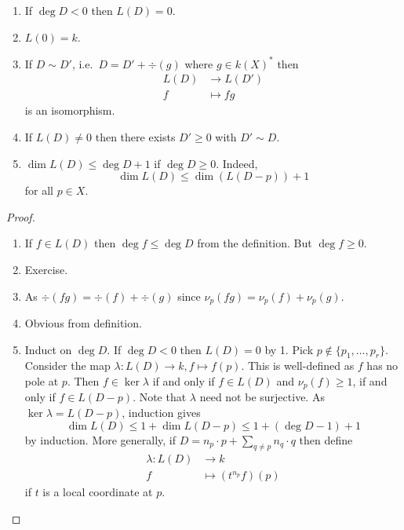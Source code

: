\documentclass[a4paper]{article}
\begin{document}
\begin{lemma}\leavevmode
  \begin{enumerate}
  \item If \(\deg D < 0\) then \(L(D) = 0\).
  \item \(L(0) = k\).
  \item If \(D \sim D'\), i.e.\ \(D = D' + \div(g)\) where \(g \in k(X)^*\) then
    \begin{align*}
      L(D) &\to L(D') \\
      f &\mapsto fg
    \end{align*}
    is an isomorphism.
  \item If \(L(D) \neq 0\) then there exists \(D' \geq 0\) with \(D' \sim D\).
  \item \(\dim L(D) \leq \deg D + 1\) if \(\deg D \geq 0\). Indeed,
    \[
      \dim L(D) \leq \dim (L(D - p)) + 1
    \]
    for all \(p \in X\).
  \end{enumerate}
\end{lemma}

\begin{proof}\leavevmode
  \begin{enumerate}
  \item If \(f \in L(D)\) then \(\deg f \leq \deg D\) from the definition. But \(\deg f \geq 0\).
  \item Exercise.
  \item As \(\div (fg) = \div(f) + \div(g)\) since \(\nu_p(fg) = \nu_p(f) + \nu_p(g)\).
  \item Obvious from definition.
  \item Induct on \(\deg D\). If \(\deg D < 0\) then \(L(D) = 0\) by 1. Pick \(p \notin \{p_1, \dots, p_r\}\). Consider the map \(\lambda: L(D) \to k, f \mapsto f(p)\). This is well-defined as \(f\) has no pole at \(p\). Then \(f \in \ker \lambda\) if and only if \(f \in L(D)\) and \(\nu_p(f) \geq 1\), if and only if \(f \in L(D - p)\). Note that \(\lambda\) need not be surjective. As \(\ker \lambda = L(D - p)\), induction gives
    \[
      \dim L(D) \leq 1 + \dim L(D - p) \leq 1 + (\deg D - 1) + 1
    \]
    by induction. More generally, if \(D = n_p \cdot p + \sum_{q \neq p} n_q \cdot q\) then define
    \begin{align*}
      \lambda: L(D) &\to k \\
      f &\mapsto (t^{n_p} f)(p)
    \end{align*}
    if \(t\) is a local coordinate at \(p\).
  \end{enumerate}
\end{proof}
\end{document}
